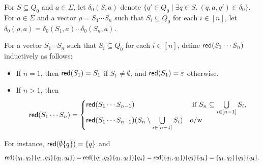 For $S \subseteq Q_0$ and $a \in \Sigma$, let $\delta_0(S,a)$ denote $\{q' \in Q_0 \mid \exists q \in S.\ (q,a,q') \in \delta_0 \}$. For $a \in \Sigma$ and a vector $\rho = S_1 \cdots S_n$ such that $S_i \subseteq Q_0$ for each $i \in [n]$, let $\delta_0(\rho,a)=\delta_0(S_1,a) \cdots \delta_0(S_n, a)$.

For a vector $S_1 \cdots S_n$ such that $S_i \subseteq Q_0$ for each $i \in [n]$, define $\mathsf{red}(S_1 \cdots S_n)$ inductively as follows:  
\begin{itemize}
\item If $n = 1$, then $\mathsf{red}(S_1)=S_1$ if $S_1 \neq \emptyset$, and $\mathsf{red}(S_1)=\varepsilon$ otherwise.
% 
\item If $n > 1$, then 
\[
\mathsf{red}(S_1 \cdots S_n)=
\begin{cases}
\mathsf{red}(S_1 \cdots S_{n-1}) & \mbox{ if } S_n \subseteq \bigcup \limits_{i \in [n-1]} S_i,\\
\mathsf{red}(S_1 \cdots S_{n-1}) (S_n \setminus \bigcup \limits_{i \in [n-1]} S_i) &  \mbox{o/w}
\end{cases}
\]
%
\end{itemize}
For instance, 
%
$\mathsf{red}(\emptyset\{q\})=\{q\}$ and 
$$\mathsf{red}(\{q_1, q_2\} \{q_1, q_3\} \{q_2, q_4\})=\mathsf{red}(\{q_1,q_2\}\{q_1,q_3\})\{q_4\}= \mathsf{red}(\{q_1,q_2\}) \{q_3\} \{q_4\} = \{q_1,q_2\} \{q_3\}\{q_4\}.$$

